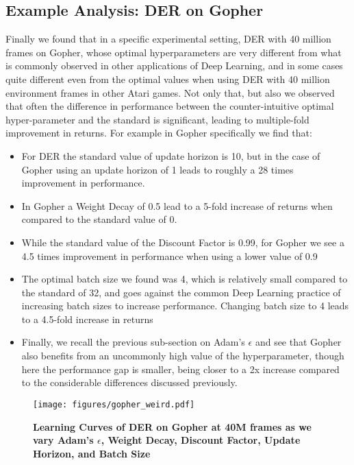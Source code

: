 \documentclass[10pt]{article} %
\begin{document}
\subsection{Example Analysis: DER on Gopher}
\label{sec:gopher}
Finally we found that in a specific experimental setting, DER with 40 million frames on Gopher, whose optimal hyperparameters are very different from what is commonly observed in other applications of Deep Learning, and in some cases quite different even from the optimal values when using DER with 40 million environment frames in other Atari games. Not only that, but also we observed that often the difference in performance between the counter-intuitive optimal hyper-parameter and the standard is significant, leading to multiple-fold improvement in returns.
For example in Gopher specifically we find that:
\begin{itemize}
    \item For DER the standard value of update horizon is 10, but in the case of Gopher using an update horizon of 1 leads to roughly a 28 times improvement in performance.
    \item In Gopher a Weight Decay of 0.5 lead to a 5-fold increase of returns when compared to the standard value of 0.
    \item While the standard value of the Discount Factor is 0.99, for Gopher we see a 4.5 times improvement in performance when using a lower value of 0.9
    \item The optimal batch size we found was 4, which is relatively small compared to the standard of 32, and goes against the common Deep Learning practice of increasing batch sizes to increase performance. Changing batch size to 4 leads to a 4.5-fold increase in returns
    \item Finally, we recall the previous sub-section on Adam's $\epsilon$ and see that Gopher also benefits from an uncommonly high value of the hyperparameter, though here the performance gap is smaller, being closer to a 2x increase compared to the considerable differences discussed previously.
\end{itemize}

\begin{figure}[!ht]
    \centering
  \texttt{[image: figures/gopher\_weird.pdf]}%
    \caption{
     \textbf{Learning Curves of DER on Gopher at 40M frames as we vary Adam's $\epsilon$, Weight Decay, Discount Factor, Update Horizon, and Batch Size}
    }
    \label{fig:weird_gopher}
\end{figure}
\end{document}
